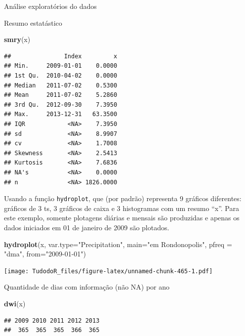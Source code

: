 \documentclass[
]{book}
\newenvironment{Shaded}{\begin{snugshade}}{\end{snugshade}}
\newcommand{\DataTypeTok}[1]{\textcolor[rgb]{0.13,0.29,0.53}{#1}}
\newcommand{\KeywordTok}[1]{\textcolor[rgb]{0.13,0.29,0.53}{\textbf{#1}}}
\newcommand{\NormalTok}[1]{#1}
\newcommand{\StringTok}[1]{\textcolor[rgb]{0.31,0.60,0.02}{#1}}
\begin{document}
Análise exploratórios do dados

Resumo estatástico

\begin{Shaded}
\begin{Highlighting}[]
\KeywordTok{smry}\NormalTok{(x)}
\end{Highlighting}
\end{Shaded}

\begin{verbatim}
##               Index         x
## Min.     2009-01-01    0.0000
## 1st Qu.  2010-04-02    0.0000
## Median   2011-07-02    0.5300
## Mean     2011-07-02    5.2860
## 3rd Qu.  2012-09-30    7.3950
## Max.     2013-12-31   63.3500
## IQR            <NA>    7.3950
## sd             <NA>    8.9907
## cv             <NA>    1.7008
## Skewness       <NA>    2.5413
## Kurtosis       <NA>    7.6836
## NA's           <NA>    0.0000
## n              <NA> 1826.0000
\end{verbatim}

Usando a função \texttt{hydroplot}, que (por padrão) representa 9 gráficos diferentes: gráficos de 3 ts, 3 gráficos de caixa e 3 histogramas com um resumo ``x''. Para este exemplo, somente plotagens diárias e mensais são produzidas e apenas os dados iniciados em 01 de janeiro de 2009 são plotados.

\begin{Shaded}
\begin{Highlighting}[]
\KeywordTok{hydroplot}\NormalTok{(x, }\DataTypeTok{var.type=}\StringTok{"Precipitation"}\NormalTok{, }\DataTypeTok{main=}\StringTok{"em Rondonopolis"}\NormalTok{,}
          \DataTypeTok{pfreq =} \StringTok{"dma"}\NormalTok{, }\DataTypeTok{from=}\StringTok{"2009-01-01"}\NormalTok{)}
\end{Highlighting}
\end{Shaded}

\texttt{[image: TudodoR\_files/figure-latex/unnamed-chunk-465-1.pdf]}

Quantidade de dias com informação (não NA) por ano

\begin{Shaded}
\begin{Highlighting}[]
\KeywordTok{dwi}\NormalTok{(x)}
\end{Highlighting}
\end{Shaded}

\begin{verbatim}
## 2009 2010 2011 2012 2013 
##  365  365  365  366  365
\end{verbatim}
\end{document}
